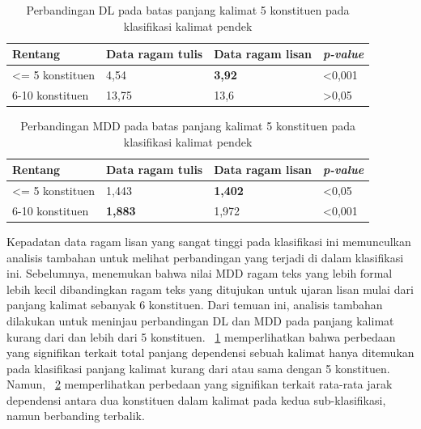 \begin{table}
\begin{center}
\begin{small}
\caption{Perbandingan DL pada batas panjang kalimat 5 konstituen pada klasifikasi kalimat pendek}\label{tab:DL_5}
  \begin{tabular}{ | p{3.2cm} | p{3.2cm} | p{3.2cm} | p{2cm} |}
    \hline
Rentang & Data ragam tulis & Data ragam lisan & \textit{p-value} \\ \hline
\textless= 5 konstituen & 4,54 & \textbf{3,92} & \textless 0,001 \\ \hline
6-10 konstituen & 13,75 & 13,6 & \textgreater 0,05 \\ \hline
   \end{tabular}
   \end{small}
\end{center}
\end{table}

\begin{table}
\begin{center}
\begin{small}
\caption{Perbandingan MDD pada batas panjang kalimat 5 konstituen pada klasifikasi kalimat pendek}\label{tab:MDD_5}
  \begin{tabular}{ | p{3.2cm} | p{3.2cm} | p{3.2cm} | p{2cm} |}
    \hline
Rentang & Data ragam tulis & Data ragam lisan & \textit{p-value} \\ \hline
\textless= 5 konstituen & 1,443 & \textbf{1,402} & \textless 0,05 \\ \hline
6-10 konstituen & \textbf{1,883} & 1,972 & \textless 0,001 \\ \hline
   \end{tabular}
   \end{small}
\end{center}
\end{table}

Kepadatan data ragam lisan yang sangat tinggi pada klasifikasi ini memunculkan analisis tambahan untuk melihat perbandingan yang terjadi di dalam klasifikasi ini. Sebelumnya, \cite{wang2017effects} menemukan bahwa nilai MDD ragam teks yang lebih formal lebih kecil dibandingkan ragam teks yang ditujukan untuk ujaran lisan mulai dari panjang kalimat sebanyak 6 konstituen. Dari temuan ini, analisis tambahan dilakukan untuk meninjau perbandingan DL dan MDD pada panjang kalimat kurang dari dan lebih dari 5 konstituen. \tab~\ref{tab:DL_5} memperlihatkan bahwa perbedaan yang signifikan terkait total panjang dependensi sebuah kalimat hanya ditemukan pada klasifikasi panjang kalimat kurang dari atau sama dengan 5 konstituen. Namun, \tab~\ref{tab:MDD_5} memperlihatkan perbedaan yang signifikan terkait rata-rata jarak dependensi antara dua konstituen dalam kalimat pada kedua sub-klasifikasi, namun berbanding terbalik. 

